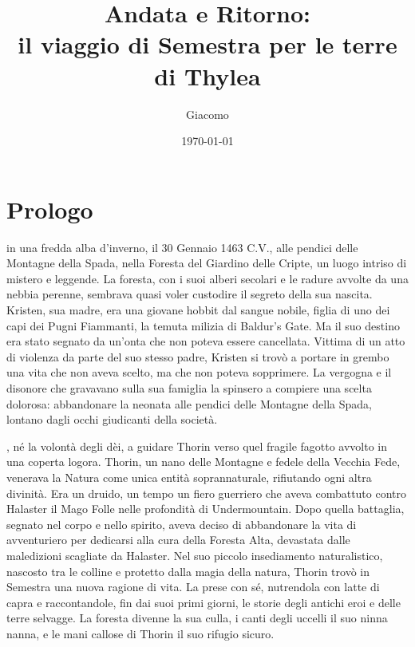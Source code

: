 \documentclass[letterpaper,twocolumn,openany,nodeprecatedcode]{dndbook}
\title{\sc Andata e Ritorno:\\ il viaggio di Semestra per le terre di Thylea}
\author{\sc Giacomo}
\date{\today}
\begin{document}
\frontmatter

\maketitle

\tableofcontents

\mainmatter%

\chapter*{Prologo}
\justifying
{} in una fredda alba d’inverno, il 30 Gennaio 1463 C.V., 
alle pendici delle Montagne della Spada, nella Foresta del Giardino delle Cripte, un luogo intriso 
di mistero e leggende. La foresta, con i suoi alberi secolari e le radure avvolte da una nebbia 
perenne, sembrava quasi voler custodire il segreto della sua nascita. Kristen, sua madre, era una 
giovane hobbit dal sangue nobile, figlia di uno dei capi dei Pugni Fiammanti, la temuta milizia di 
Baldur's Gate. Ma il suo destino era stato segnato da un’onta che non poteva essere cancellata. 
Vittima di un atto di violenza da parte del suo stesso padre, Kristen si trovò a portare in grembo 
una vita che non aveva scelto, ma che non poteva sopprimere. La vergogna e il disonore che 
gravavano sulla sua famiglia la spinsero a compiere una scelta dolorosa: abbandonare la neonata 
alle pendici delle Montagne della Spada, lontano dagli occhi giudicanti della società.

, né la volontà degli dèi, a guidare Thorin verso quel fragile fagotto avvolto in 
una coperta logora. Thorin, un nano delle Montagne e fedele della Vecchia Fede, venerava la Natura 
come unica entità soprannaturale, rifiutando ogni altra divinità. Era un druido, un tempo un fiero 
guerriero che aveva combattuto contro Halaster il Mago Folle nelle profondità di Undermountain. 
Dopo quella battaglia, segnato nel corpo e nello spirito, aveva deciso di abbandonare la vita di 
avventuriero per dedicarsi alla cura della Foresta Alta, devastata dalle maledizioni scagliate da 
Halaster. Nel suo piccolo insediamento naturalistico, nascosto tra le colline e protetto dalla 
magia della natura, Thorin trovò in Semestra una nuova ragione di vita. La prese con sé, nutrendola 
con latte di capra e raccontandole, fin dai suoi primi giorni, le storie degli antichi eroi e delle 
terre selvagge. La foresta divenne la sua culla, i canti degli uccelli il suo ninna nanna, e le mani 
callose di Thorin il suo rifugio sicuro. 
\end{document}

